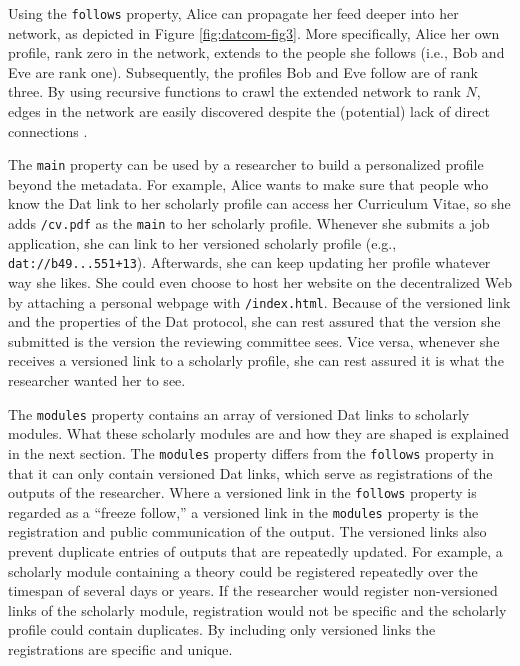 \documentclass[publications,article,submit,moreauthors,pdftex,10pt,a4paper]{Definitions/mdpi}
\begin{document}
Using the \texttt{follows} property, Alice can propagate her feed deeper
into her network, as depicted in Figure \ref{fig:datcom-fig3}. More
specifically, Alice her own profile, rank zero in the network, extends
to the people she follows (i.e., Bob and Eve are rank one).
Subsequently, the profiles Bob and Eve follow are of rank three. By
using recursive functions to crawl the extended network to rank \(N\),
edges in the network are easily discovered despite the (potential) lack
of direct connections \citep{doi:10.2307/2786545}.

The \texttt{main} property can be used by a researcher to build a
personalized profile beyond the metadata. For example, Alice wants to
make sure that people who know the Dat link to her scholarly profile can
access her Curriculum Vitae, so she adds \texttt{/cv.pdf} as the
\texttt{main} to her scholarly profile. Whenever she submits a job
application, she can link to her versioned scholarly profile (e.g.,
\texttt{dat://b49...551+13}). Afterwards, she can keep updating her
profile whatever way she likes. She could even choose to host her
website on the decentralized Web by attaching a personal webpage with
\texttt{/index.html}. Because of the versioned link and the properties
of the Dat protocol, she can rest assured that the version she submitted
is the version the reviewing committee sees. Vice versa, whenever she
receives a versioned link to a scholarly profile, she can rest assured
it is what the researcher wanted her to see.

The \texttt{modules} property contains an array of versioned Dat links
to scholarly modules. What these scholarly modules are and how they are
shaped is explained in the next section. The \texttt{modules} property
differs from the \texttt{follows} property in that it can only contain
versioned Dat links, which serve as registrations of the outputs of the
researcher. Where a versioned link in the \texttt{follows} property is
regarded as a ``freeze follow,'' a versioned link in the
\texttt{modules} property is the registration and public communication
of the output. The versioned links also prevent duplicate entries of
outputs that are repeatedly updated. For example, a scholarly module
containing a theory could be registered repeatedly over the timespan of
several days or years. If the researcher would register non-versioned
links of the scholarly module, registration would not be specific and
the scholarly profile could contain duplicates. By including only
versioned links the registrations are specific and unique.
\end{document}
